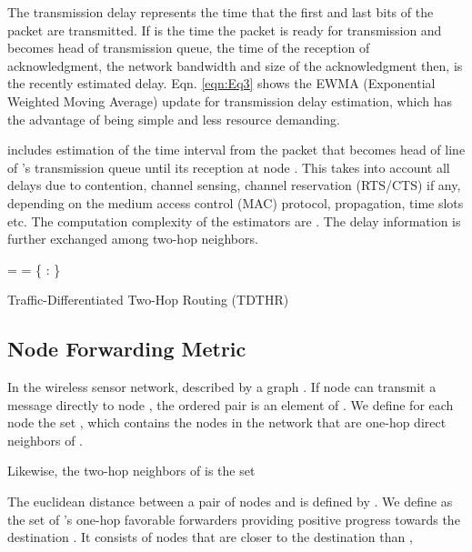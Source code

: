 \documentclass[fleqn,twoside]{article}
\begin{document}
The transmission delay represents the time that the first and last bits of the packet
are transmitted. If  is the time the packet is ready for transmission and becomes head of transmission queue,  the 
time of the reception of acknowledgment,  the network bandwidth and size of the acknowledgment then,  is the recently
estimated delay. Eqn. \ref{eqn:Eq3} shows the EWMA (Exponential Weighted 
Moving Average) update for transmission delay 
estimation, which has the advantage of being simple and less resource demanding. 

 includes estimation of the time interval from the packet that becomes head of line of 's transmission queue until 
its reception at node . This takes into account all delays due
to contention, channel sensing, channel reservation (RTS/CTS) if any, depending on the medium access control (MAC) protocol,
propagation, time slots etc. The computation complexity of the estimators are . The delay information is further exchanged among two-hop neighbors.

\begin{algorithm}
\begin{footnotesize}
\KwIn{, , , , }
\BlankLine


 =  \;
 = \{ : \} \;
\caption{Traffic-Differentiated Two-Hop Routing (TDTHR)}
\label{algo:tdthr}
\end{footnotesize}
\end{algorithm}


\subsection{Node Forwarding Metric}
In the wireless sensor network, described by a graph . If node  
can transmit a message directly to node , the ordered pair is an element of . We define for each node  the set , which contains the nodes
in the network  that are one-hop  direct neighbors of .


Likewise, the two-hop neighbors of  is the set  

The euclidean distance between a pair of nodes  and  is defined by . We define  as the set of 's one-hop favorable forwarders providing positive progress towards the destination . It consists of nodes that are closer to the destination than , 
\end{document}
